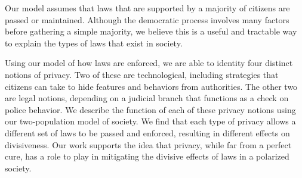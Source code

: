 Our model assumes that laws that are supported by a majority of citizens are passed or maintained.  Although the democratic process involves many factors before gathering a simple majority, we believe this is a useful and tractable way to explain the types of laws that exist in society.

Using our model of how laws are enforced, we are able to identity four distinct notions of privacy.  Two of these are technological, including strategies that citizens can take to hide features and behaviors from authorities.  The other two are legal notions, depending on a judicial branch that functions as a check on police behavior.  We describe the function of each of these privacy notions using our two-population model of society.  We find that each type of privacy allows a different set of laws to be passed and enforced, resulting in different effects on divisiveness.  Our work supports the idea that privacy, while far from a perfect cure, has a role to play in mitigating the divisive effects of laws in a polarized society.



